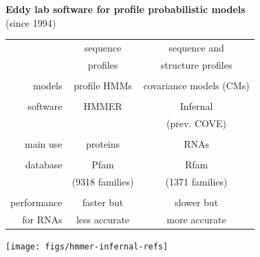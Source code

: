 \documentclass[landscape]{slides}
\begin{document}
\begin{slide}
\begin{center}
\textbf{Eddy lab software for profile probabilistic models} \\
(since 1994)
\end{center}
\medskip

\begin{center}
\small
\begin{tabular}{r|cc} 
             & sequence & sequence and \\
             & profiles & structure profiles \\ \hline
  \\
  models     & profile HMMs    & {\color{red} covariance models (CMs)} \\ 
  \\
  software   & {\sc HMMER}     & {\sc Infernal} \\ 
             &                 & (prev. COVE) \\
  \\
  main use   & proteins        & RNAs \\ 
  \\
  database   & {\sc Pfam}      & {\sc Rfam} \\
             & (9318 families) & (1371 families) \\
  \\
  performance& faster but    & slower but    \\
  for RNAs   & less accurate & more accurate \\
\end{tabular}

\hspace{1.2in}\texttt{[image: figs/hmmer-infernal-refs]}

\end{center}

\vfill

\end{slide}
\end{document}
